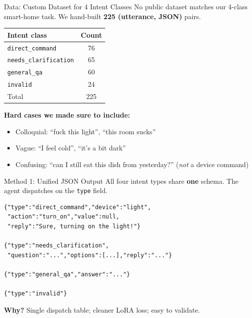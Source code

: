 \documentclass[aspectratio=169]{beamer}
\begin{document}
\begin{frame}{Data: Custom Dataset for 4 Intent Classes}
No public dataset matches our 4-class smart-home task.
We hand-built \textbf{225 (utterance, JSON)} pairs.
\vspace{0.5em}
\begin{table}[h]
\centering
\small
\begin{tabular}{lc}
\toprule
\textbf{Intent class} & \textbf{Count} \\
\midrule
\texttt{direct\_command} & 76 \\
\texttt{needs\_clarification} & 65 \\
\texttt{general\_qa} & 60 \\
\texttt{invalid} & 24 \\
\midrule
Total & 225 \\
\bottomrule
\end{tabular}
\end{table}
\vspace{0.5em}
\textbf{Hard cases we made sure to include:}
\begin{itemize}
\item Colloquial: ``fuck this light'', ``this room sucks''
\item Vague: ``I feel cold'', ``it's a bit dark''
\item Confusing: ``can I still eat this dish from yesterday?'' (\emph{not} a device command)
\end{itemize}
\end{frame}

\begin{frame}[fragile]{Method 1: Unified JSON Output}
All four intent types share \textbf{one} schema. The agent dispatches on the \texttt{type} field.
\begin{lstlisting}
{"type":"direct_command","device":"light",
 "action":"turn_on","value":null,
 "reply":"Sure, turning on the light!"}

{"type":"needs_clarification",
 "question":"...","options":[...],"reply":"..."}

{"type":"general_qa","answer":"..."}

{"type":"invalid"}
\end{lstlisting}
\vspace{0.3em}
\textbf{Why?} Single dispatch table; cleaner LoRA loss; easy to validate.
\end{frame}
\end{document}

